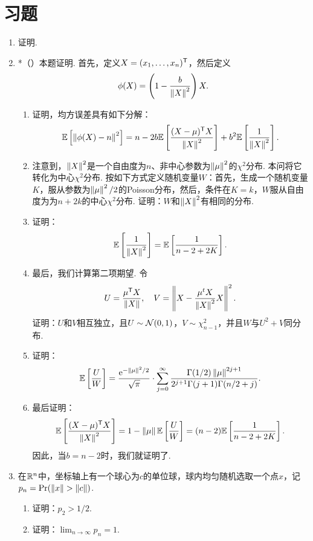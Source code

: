 \section{习题}

\begin{enumerate}[wide,labelindent=0pt]
    \item \label{exercise:volume-surface-area} 证明. 
    \item *\label{exercise:stein-paradox}（\cite{jamesEstimationQuadraticLoss1961}）本题证明. 首先，定义$X=(x_1,\dots,x_n)^{\mathsf{T}}$，然后定义
    \[\phi(X)=\left(1-\frac{b}{\left\|X\right\|^2}\right)X.\]
    \begin{enumerate}
        \item 证明，均方误差具有如下分解：
        \[\mathbb{E}\left[\left\|\phi(X)-n\right\|^2\right]=n-2b\mathbb{E}\left[\frac{(X-\mu)^{\mathsf{T}} X}{\left\|X\right\|^2}\right]+b^2\mathbb{E}\left[\frac{1}{\left\|X\right\|^2}\right].\]
        \item 注意到，$\left\|X\right\|^2$是一个自由度为$n$、非中心参数为$\left\|\mu\right\|^2$的$\chi^2$分布. 本问将它转化为中心$\chi^2$分布. 按如下方式定义随机变量$W$：首先，生成一个随机变量$K$，服从参数为$\left\|\mu\right\|^2/2$的Poisson分布，然后，条件在$K=k$，$W$服从自由度为为$n+2k$的中心$\chi^2$分布. 证明：$W$和$\left\|X\right\|^2$有相同的分布. 
        \item 证明：
        \[\mathbb{E}\left[\frac{1}{\left\|X\right\|^2}\right]=\mathbb{E}\left[\frac{1}{n-2+2K}\right].\]
        \item 最后，我们计算第二项期望. 令
        \[U=\frac{\mu^{\mathsf{T}} X}{\left\|X\right\|},\quad V=\left\|X-\frac{\mu^t X}{\left\|X\right\|^2}X\right\|^2.\]
        证明：$U$和$V$相互独立，且$U\sim\mathcal{N}(0,1)$，$V\sim\chi_{n-1}^2$，并且$W$与$U^2+V$同分布. 
        \item 证明：
        \[\mathbb{E}\left[\frac{U}{W}\right]=\frac{\mathrm{e}^{-\left\|\mu\right\|^2/2}}{\sqrt{\pi}}\cdot\sum_{j=0}^\infty\frac{\Gamma(1/2)\left\|\mu\right\|^{2j+1}}{2^{j+1}\Gamma(j+1)\Gamma(n/2+j)}.\]
        \item 最后证明：
        \[\mathbb{E}\left[\frac{(X-\mu)^{\mathsf{T}} X}{\left\|X\right\|^2}\right]=1-\left\|\mu\right\|\mathbb{E}\left[\frac{U}{W}\right]=(n-2)\mathbb{E}\left[\frac{1}{n-2+2K}\right].\]
        因此，当$b=n-2$时，我们就证明了.
    \end{enumerate}

    \item \label{exercise:circle-sample} 在$\mathbb{R}^n$中，坐标轴上有一个球心为$c$的单位球，球内均匀随机选取一个点$x$，记$p_n=\Pr(\norm{x}>\norm{c})$. 
    \begin{enumerate}
        \item 证明：$p_2>1/2$.
        \item 证明：$\lim_{n\to\infty}p_n=1$.
    \end{enumerate}


\end{enumerate}
